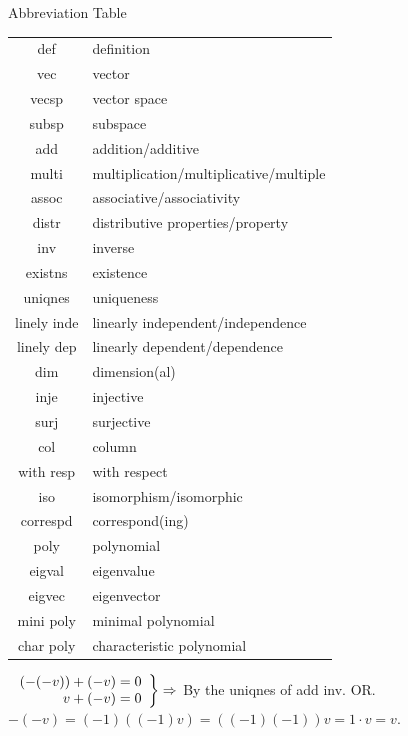 \documentclass[a4paper, 11pt, UTF8]{article}
\def\Or{{\large O{\footnotesize R.} }}
\begin{document}
\begin{large}
{\begin{center}
\vspace{20pt}
Abbreviation Table\vspace{8pt}\par
\begin{tabularx}{0.55\textwidth} { 
		| c |
		| >{\raggedright\arraybackslash}X| }
	\hline
def&			definition\\
vec&			vector\\
vecsp&			vector space\\
subsp&			subspace\\
add&			addition/additive\\
multi&			multiplication/multiplicative/multiple\\
assoc&			associative/associativity\\
distr&			distributive properties/property\\
inv&			inverse\\
existns&		existence\\
uniqnes&		uniqueness\\
linely inde&	linearly independent/independence\\
linely dep&		linearly dependent/dependence\\
dim&			dimension(al)\\
inje&			injective\\
surj&			surjective\\
col&			column\\
with resp&		with respect\\
iso&			isomorphism/isomorphic\\
correspd&		correspond(ing)\\
poly&			polynomial\\
eigval&			eigenvalue\\
eigvec&			eigenvector\\
mini poly&		minimal polynomial\\
char poly&		characteristic polynomial\\\hline
\end{tabularx}
\end{center}

\clearpage
}{}


\hspace{-6pt}$\MathRightBrace{r}{\,(-(-v))+(-v)=0\\$ $v+(-v)=0}\Rightarrow$ By the uniqnes of add inv. \PfEnd\vspace{6pt}\qquad\qquad\quad
\Or $-(-v)=(-1)((-1)v)=((-1)(-1))v=1\cdot v=v.$\PfEnd
\SepLine\par


\end{large}
\end{document}
